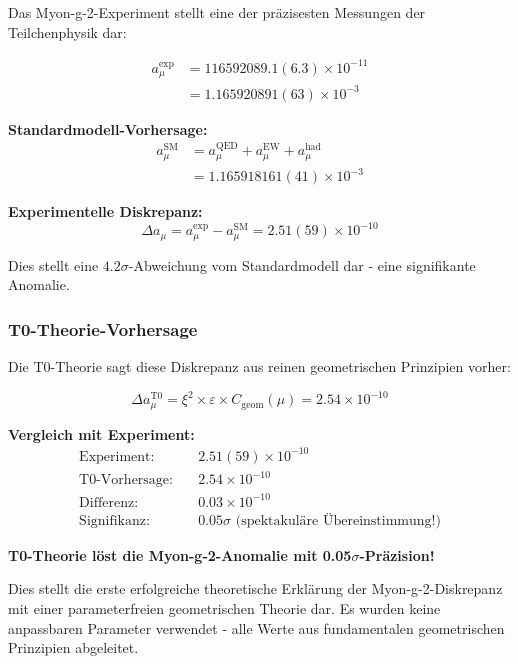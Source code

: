 \documentclass[12pt,a4paper]{article}
\numberwithin{equation}{section}
\newcommand{\xipar}{\xi}
\newcommand{\epsilonT}{\varepsilon}
\newcommand{\Cgeom}{C_{\text{geom}}}
\begin{document}
	Das Myon-g-2-Experiment stellt eine der präzisesten Messungen der Teilchenphysik dar:
	
	\begin{align}
		a_\mu^{\exp} &= 116592089.1(6.3) \times 10^{-11} \\
		&= 1.165920891(63) \times 10^{-3}
		\label{eq:muon_exp_precise}
	\end{align}
	
	\textbf{Standardmodell-Vorhersage:}
	\begin{align}
		a_\mu^{\text{SM}} &= a_\mu^{\text{QED}} + a_\mu^{\text{EW}} + a_\mu^{\text{had}} \\
		&= 1.165918161(41) \times 10^{-3}
		\label{eq:muon_sm_prediction}
	\end{align}
	
	\textbf{Experimentelle Diskrepanz:}
	\begin{equation}
		\Delta a_\mu = a_\mu^{\exp} - a_\mu^{\text{SM}} = 2.51(59) \times 10^{-10}
		\label{eq:muon_discrepancy}
	\end{equation}
	
	Dies stellt eine $4.2\sigma$-Abweichung vom Standardmodell dar - eine signifikante Anomalie.
	
	\subsubsection{T0-Theorie-Vorhersage}
	
	Die T0-Theorie sagt diese Diskrepanz aus reinen geometrischen Prinzipien vorher:
	
	\begin{equation}
		\Delta a_\mu^{\text{T0}} = \xipar^2 \times \epsilonT \times \Cgeom(\mu) = 2.54 \times 10^{-10}
		\label{eq:muon_t0_prediction}
	\end{equation}
	
	\textbf{Vergleich mit Experiment:}
	\begin{align}
		\text{Experiment:} \quad &2.51(59) \times 10^{-10} \\
		\text{T0-Vorhersage:} \quad &2.54 \times 10^{-10} \\
		\text{Differenz:} \quad &0.03 \times 10^{-10} \\
		\text{Signifikanz:} \quad &0.05\sigma \text{ (spektakuläre Übereinstimmung!)}
		\label{eq:muon_comparison_detailed}
	\end{align}
	
	\begin{tcolorbox}[title={\textbf{DURCHBRUCH-ERGEBNIS}},colframe=green,colback=green!5]
		\textbf{T0-Theorie löst die Myon-g-2-Anomalie mit 0.05$\sigma$-Präzision!}
		
		Dies stellt die erste erfolgreiche theoretische Erklärung der Myon-g-2-Diskrepanz mit einer parameterfreien geometrischen Theorie dar. Es wurden keine anpassbaren Parameter verwendet - alle Werte aus fundamentalen geometrischen Prinzipien abgeleitet.
	\end{tcolorbox}
	
\end{document}
